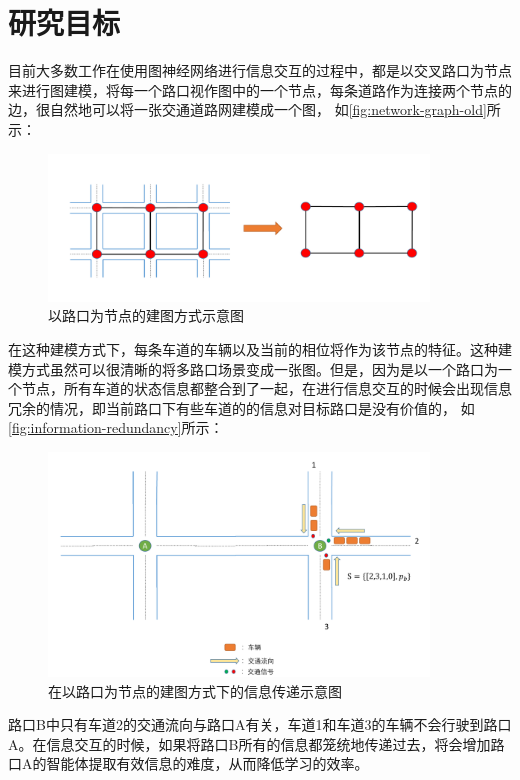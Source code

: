 \section{研究目标}
目前大多数工作在使用图神经网络进行信息交互的过程中，都是以交叉路口为节点来进行图建模，将每一个路口视作图中的一个节点，每条道路作为连接两个节点的边，很自然地可以将一张交通道路网建模成一个图， 如\autoref{fig:network-graph-old}所示：
\begin{figure}[htb]
  \includegraphics[width=0.9\textwidth]{fig/network-graph.pdf}
  \caption{以路口为节点的建图方式示意图}
  \label{fig:network-graph-old}
\end{figure}
在这种建模方式下，每条车道的车辆以及当前的相位将作为该节点的特征。这种建模方式虽然可以很清晰的将多路口场景变成一张图。但是，因为是以一个路口为一个节点，所有车道的状态信息都整合到了一起，在进行信息交互的时候会出现信息冗余的情况，即当前路口下有些车道的的信息对目标路口是没有价值的，
如\autoref{fig:information-redundancy}所示：
\begin{figure}[htb]
  \includegraphics[width=0.9\textwidth]{fig/information-redundancy.pdf}
  \caption{在以路口为节点的建图方式下的信息传递示意图}
  \label{fig:information-redundancy}
\end{figure}
路口B中只有车道2的交通流向与路口A有关，车道1和车道3的车辆不会行驶到路口A。在信息交互的时候，如果将路口B所有的信息都笼统地传递过去，将会增加路口A的智能体提取有效信息的难度，从而降低学习的效率。

